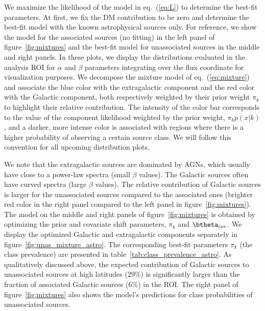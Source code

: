 We maximize the likelihood of the model in eq.~(\ref{eq:L}) to determine the best-fit parameters.
At first, we fix the DM contribution to be zero and determine the best-fit model with the known astrophysical sources only.
For reference, we show the model for the associated sources (no fitting) in the left panel of figure~\ref{fig:mixtures} and the best-fit model for unassociated sources in the middle and right panels.
In these plots, we display the distributions evaluated in the analysis ROI for $\alpha$ and $\beta$ parameters integrating over the flux coordinate for visualization purposes. We decompose the mixture model of eq.~(\ref{eq:mixture}) and associate the blue color with the extragalactic component and the red color with the Galactic component, both respectively weighted by their prior weight $\pi_k$ to highlight their relative contribution. The intensity of the color bar corresponds to the value of the component likelihood weighted by the prior weight, $\pi_k p(x | k)$, and a darker, more intense color is associated with regions where there is a higher probability of observing a certain source class. We will follow this convention for all upcoming distribution plots.

We note that the extragalactic sources are dominated by AGNs, which usually have close to a power-law spectra (small $\beta$ values).
The Galactic sources often have curved spectra (large $\beta$ values).
The relative contribution of Galactic sources is larger for the unassociated sources compared to the associated ones (brighter red color in the right panel compared to the left panel in figure~\ref{fig:mixtures}).
The model on the middle and right panels of figure~\ref{fig:mixtures} is obtained by optimizing the prior and covariate shift parameters, $\pi_k$ and $\btheta_\textrm{cov}$.
We display the optimized Galactic and extragalactic components separately in figure~\ref{fig:unas_mixture_astro}.
The corresponding best-fit parameters $\pi_k$ (the class prevalence) are presented in table~\ref{tab:class_prevalence_astro}. 
As qualitatively discussed above, the expected contribution of Galactic sources to unassociated sources at high latitudes (29\%) is significantly larger than the fraction of associated Galactic sources (6\%) in the ROI.
The right panel of figure~\ref{fig:mixtures} also shows the model's predictions for class probabilities of unassociated sources. 


